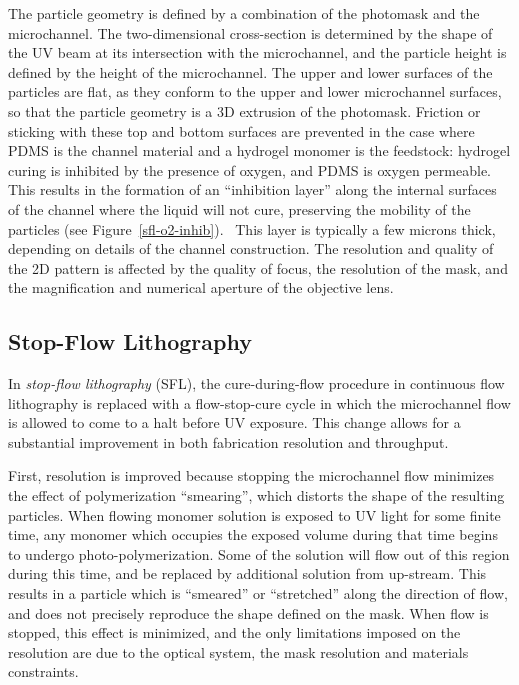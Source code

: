 The particle geometry is defined by a combination of the photomask and the microchannel.  The two-dimensional cross-section
is determined by the shape of the UV beam at its intersection with the microchannel, and the particle height is defined by
the height of the microchannel. The upper and lower surfaces of the particles
are flat, as they conform to the upper and lower microchannel surfaces, so that the particle geometry
is a 3D extrusion of the photomask.
Friction or sticking with these top and bottom
surfaces are prevented in the case where PDMS is the channel material and a hydrogel monomer is the feedstock: hydrogel
curing is inhibited by the presence of oxygen, and PDMS is oxygen permeable. This results in the formation of an 
``inhibition layer'' along the internal surfaces of the channel where the liquid will not cure, preserving the mobility 
of the particles (see Figure~\ref{sfl-o2-inhib}).~\cite{dendukuri-oxygen}
This layer is typically a few microns thick, depending on 
details of the channel construction.
The resolution and quality of the 2D pattern 
is affected by the quality of focus, the resolution of the mask,
and the magnification and numerical aperture of the objective lens.  

\subsection{Stop-Flow Lithography}
\label{sec:SFL}

In \textit{stop-flow lithography} (SFL), the cure-during-flow
procedure in continuous flow lithography is replaced with a flow-stop-cure cycle in which the microchannel flow
is allowed to come to a halt before UV exposure. This change allows for a substantial improvement in both 
fabrication resolution and throughput.~\cite{dendukuri-sfl}

First, resolution is improved because stopping the microchannel flow minimizes the effect of polymerization
``smearing'', which distorts the shape of the resulting particles.
When flowing monomer solution is exposed to UV light for some finite time, any monomer which occupies the exposed volume 
during that time begins to undergo photo-polymerization.  Some of the solution will flow out of this region 
during this time, and be replaced by additional solution from up-stream. This results in a particle which is ``smeared''
or ``stretched'' along the direction of flow, and does not precisely reproduce the shape defined on the mask.  
When flow is 
stopped, this effect is minimized, and the only limitations imposed on the resolution are due to the optical system,
the mask resolution and materials constraints.


